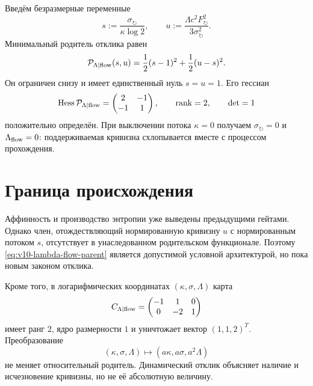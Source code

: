 Введём безразмерные переменные
\begin{equation}
 s:=\frac{\sigma_\circlearrowright}{\kappa\log2},
 \qquad
 u:=\frac{\Lambda c^2F_\circlearrowright^2}
 {3\sigma_\circlearrowright^2}.
\end{equation}
Минимальный родитель отклика равен
\begin{equation}
 \mathcal P_{\Lambda\mid\rm flow}(s,u)
 =\frac12(s-1)^2+\frac12(u-s)^2.
 \label{eq:v10-lambda-flow-parent}
\end{equation}
Он ограничен снизу и имеет единственный нуль $s=u=1$. Его гессиан
\begin{equation}
 \operatorname{Hess}\mathcal P_{\Lambda\mid\rm flow}
 =\begin{pmatrix}2&-1\\-1&1\end{pmatrix},
 \qquad \operatorname{rank}=2,
 \qquad \det=1
 \label{eq:v10-lambda-flow-hessian}
\end{equation}
положительно определён. При выключении потока
$\kappa=0$ получаем $\sigma_\circlearrowright=0$ и
$\Lambda_{\rm flow}=0$: поддерживаемая кривизна схлопывается вместе с
процессом прохождения.

\section{Граница происхождения}

Аффинность и производство энтропии уже выведены предыдущими гейтами.
Однако член, отождествляющий нормированную кривизну $u$ с нормированным
потоком $s$, отсутствует в унаследованном родительском функционале. Поэтому
\eqref{eq:v10-lambda-flow-parent} является допустимой условной архитектурой,
но пока новым законом отклика.

Кроме того, в логарифмических координатах $(\kappa,\sigma,\Lambda)$ карта
\begin{equation}
 C_{\Lambda\mid\rm flow}=
 \begin{pmatrix}-1&1&0\\0&-2&1\end{pmatrix}
 \label{eq:v10-lambda-flow-scale-map}
\end{equation}
имеет ранг $2$, ядро размерности $1$ и уничтожает вектор $(1,1,2)^T$.
Преобразование
\begin{equation}
 (\kappa,\sigma,\Lambda)\longmapsto
 (a\kappa,a\sigma,a^2\Lambda)
\end{equation}
не меняет относительный родитель. Динамический отклик объясняет наличие и
исчезновение кривизны, но не её абсолютную величину.


